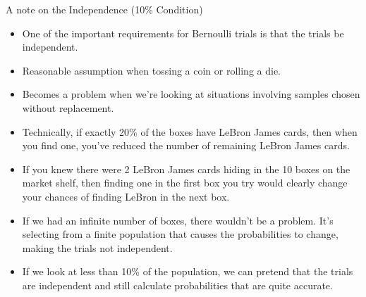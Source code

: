 \documentclass[10pt]{beamer}\usepackage[]{graphicx}\usepackage[]{color}
\begin{document}
\begin{frame}{A note on the Independence (10\% Condition)}
	\small 
	\begin{itemize}
		\item One of the important requirements for Bernoulli trials is that the trials be independent. 
		\item Reasonable assumption when tossing a coin or rolling a die.
		\item Becomes a problem when we're looking at situations involving samples chosen without replacement. 
		\item Technically, if exactly 20\% of the boxes have LeBron James cards, then when you find one, you’ve reduced the number of remaining LeBron James cards. 
		\item If you knew there were 2 LeBron James cards hiding in the 10 boxes on the market shelf, then finding one in the first box you try would
		clearly change your chances of finding LeBron in the next box.
		\item If we had an infinite number of boxes, there wouldn't be a problem. It's
		selecting from a finite population that causes the probabilities to change, making
		the trials not independent. 
		\item If we look at less than 10\% of the population, we can pretend that the
		trials are independent and still calculate probabilities that are quite accurate.
	\end{itemize}
\end{frame}
\end{document}

